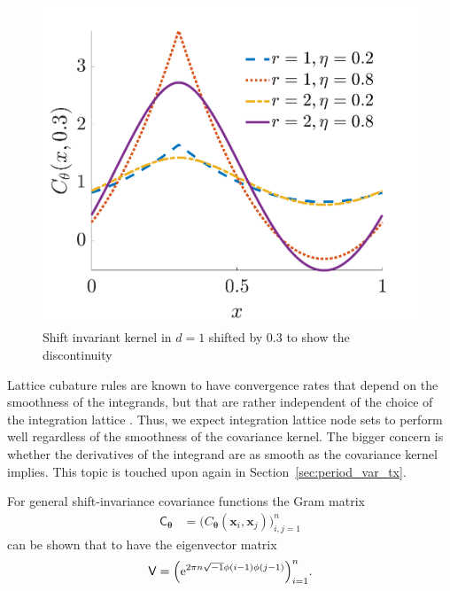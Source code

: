 \documentclass{iitthesis}          %
\newcommand{\bm}[1]{\boldsymbol{#1}}
\newcommand{\vtheta}{{\bm{\theta}}}
\newcommand{\vh}{\bm{h}}
\newcommand{\vx}{\bm{x}}
\newcommand{\vone}{\bm{1}}
\newcommand{\mC}{\mathsf{C}}
\newcommand{\mV}{\mathsf{V}}
\newcommand{\me}{\mathrm{e}}
\begin{document}
\begin{figure}
	\centering  %
	\includegraphics[width=0.9\linewidth]{"figures/fourier_kernel_dim_1"}
	\caption[Fourier kernel]{Shift invariant kernel in $d=1$ shifted by 0.3 to show the discontinuity}
	\label{fig:fourierkernel-dim1}
\end{figure}
Lattice cubature rules are known to have convergence rates that depend on the smoothness of the integrands, but that are rather independent of the choice of the integration lattice \cite{DicEtal14a}.  Thus, we expect integration lattice node sets to perform well regardless of the smoothness of the covariance kernel.  The bigger concern is whether the derivatives of the integrand are as smooth as the covariance kernel implies.  This topic is touched upon again in Section~\ref{sec:period_var_tx}.


For general shift-invariance covariance functions the Gram matrix %
\begin{align}
\label{shInvKernGramMatrix}
\mC_\vtheta &= \bigl ( C_\vtheta(\vx_i, \vx_j) \bigr)_{i, j = 1}^n 
\end{align}
can be shown that to have the eigenvector matrix %
\begin{equation} \label{latticeVdef}
\mV = \Bigl ( \me^{2 \pi n \sqrt{-1} \phi(i-1)\phi(j-1)} \Bigr)_{i = 1}^n.
\end{equation}
\end{document}
